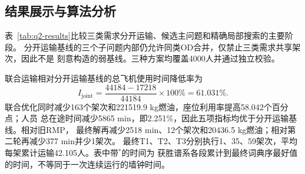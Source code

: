 \documentclass[UTF8,a4paper,zihao=5]{ctexart}
\begin{document}
\subsection{结果展示与算法分析}

表~\ref{tab:q2-results}比较三类需求分开运输、候选主问题和精确局部搜索的主要阶段。
分开运输基线的三个子问题内部仍允许同类OD合并，仅禁止三类需求共享架次，因此不是
刻意构造的弱基线。三种方案均覆盖4000人并通过独立校验。

\begin{table}[htbp]
  \centering
  \caption{问题二不同算法的结果比较}
  \label{tab:q2-results}
\end{table}

联合运输相对分开运输基线的总飞机使用时间降低率为
\begin{equation}
  I_{\mathrm{joint}}
  =\frac{44184-17218}{44184}\times100\%=61.031\%.
  \label{eq:q2-joint-improvement}
\end{equation}
联合优化同时减少163个架次和221519.9 kg燃油，座位利用率提高58.042个百分点；人员
总在途时间减少5865 min，即2.251\%，因此五项指标均优于分开运输基线。相对旧RMP，
最终解再减少2518 min、12个架次和20436.5 kg燃油；相对第二轮再减少377 min并少1架次。
最终T1、T2、T3分别执行1、35、59架次，平均每架累计运输42.105人。表中带$^{*}$的时间为
获胜谱系各段累计到最终词典序最好值的时间，不等同于一次连续运行的墙钟时间。
\end{document}
